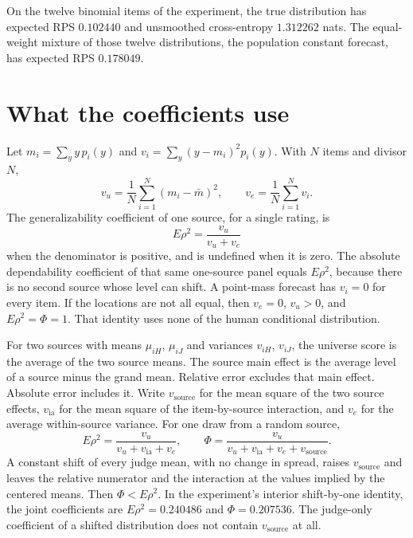 \documentclass[11pt]{article}
\begin{document}
On the twelve binomial items of the experiment, the true distribution has expected RPS $0.102440$ and unsmoothed cross-entropy $1.312262$ nats. The equal-weight mixture of those twelve distributions, the population constant forecast, has expected RPS $0.178049$.

\section{What the coefficients use}

Let $m_i=\sum_y y\,p_i(y)$ and $v_i=\sum_y(y-m_i)^2 p_i(y)$. With $N$ items and divisor $N$,
\begin{equation}
v_u=\frac1N\sum_{i=1}^N (m_i-\bar m)^2,
\qquad v_e=\frac1N\sum_{i=1}^N v_i.
\end{equation}
The generalizability coefficient of one source, for a single rating, is
\begin{equation}
E\rho^2=\frac{v_u}{v_u+v_e}
\end{equation}
when the denominator is positive, and is undefined when it is zero. The absolute dependability coefficient of that same one-source panel equals $E\rho^2$, because there is no second source whose level can shift. A point-mass forecast has $v_i=0$ for every item. If the locations are not all equal, then $v_e=0$, $v_u>0$, and $E\rho^2=\Phi=1$. That identity uses none of the human conditional distribution.

For two sources with means $\mu_{iH}$, $\mu_{iJ}$ and variances $v_{iH}$, $v_{iJ}$, the universe score is the average of the two source means. The source main effect is the average level of a source minus the grand mean. Relative error excludes that main effect. Absolute error includes it. Write $v_{\mathrm{source}}$ for the mean square of the two source effects, $v_{\mathrm{ia}}$ for the mean square of the item-by-source interaction, and $v_e$ for the average within-source variance. For one draw from a random source,
\begin{equation}
E\rho^2=\frac{v_u}{v_u+v_{\mathrm{ia}}+v_e},
\qquad
\Phi=\frac{v_u}{v_u+v_{\mathrm{ia}}+v_e+v_{\mathrm{source}}}.
\end{equation}
A constant shift of every judge mean, with no change in spread, raises $v_{\mathrm{source}}$ and leaves the relative numerator and the interaction at the values implied by the centered means. Then $\Phi<E\rho^2$. In the experiment's interior shift-by-one identity, the joint coefficients are $E\rho^2=0.240486$ and $\Phi=0.207536$. The judge-only coefficient of a shifted distribution does not contain $v_{\mathrm{source}}$ at all.
\end{document}
